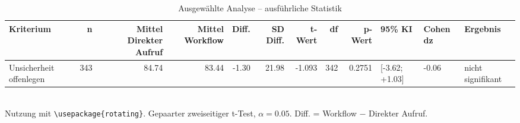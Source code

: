 \begin{table}
\centering
\caption{Ausgewählte Analyse -- ausführliche Statistik}
\begin{tabular}{lrrrrrrrrlll}
\toprule
Kriterium & n & Mittel Direkter Aufruf & Mittel Workflow & Diff. & SD Diff. & t-Wert & df & p-Wert & 95\% KI & Cohen dz & Ergebnis \\
\midrule
Unsicherheit offenlegen & 343 & 84.74 & 83.44 & -1.30 & 21.98 & -1.093 & 342 & 0.2751 & [-3.62; +1.03] & -0.06 & nicht signifikant \\
\bottomrule
\end{tabular}
\\[2mm]
\footnotesize Nutzung mit \texttt{\textbackslash usepackage\{rotating\}}. Gepaarter zweiseitiger t-Test, $\alpha=0.05$. Diff. = Workflow $-$ Direkter Aufruf.
\end{table}
